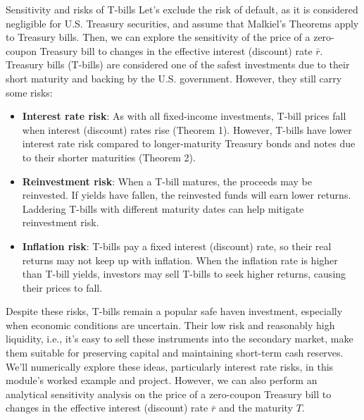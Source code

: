 \documentclass[11pt]{article}
\makeatletter
\theoremstyle{definition}
\renewcommand\subsubsection{\@startsection
	{subsubsection}{2}{0mm}
	{-0.05in}
	{-0.5\baselineskip}
	{\normalfont\normalsize\itshape\bfseries}}
\makeatother
\begin{document}
\subsubsection{Sensitivity and risks of T-bills}
Let's exclude the risk of default, as it is considered negligible for U.S. Treasury securities, and assume that Malkiel's Theorems apply to Treasury bills.
Then, we can explore the sensitivity of the price of a zero-coupon Treasury bill to changes in the effective interest (discount) rate $\bar{r}$.
Treasury bills (T-bills) are considered one of the safest investments due to their short maturity and backing by the U.S. government. 
However, they still carry some risks:
\begin{itemize}[leftmargin=*]
	\item{\textbf{Interest rate risk}: As with all fixed-income investments, T-bill prices fall when interest (discount) rates rise (Theorem 1). 
	However, T-bills have lower interest rate risk compared to longer-maturity Treasury bonds and notes due to their shorter maturities (Theorem 2).}
	\item{\textbf{Reinvestment risk}: When a T-bill matures, the proceeds may be reinvested. If yields have fallen, the reinvested funds will earn lower returns. Laddering T-bills with different maturity dates can help mitigate reinvestment risk.}
	\item{\textbf{Inflation risk}: T-bills pay a fixed interest (discount) rate, so their real returns may not keep up with inflation. When the inflation rate is higher than T-bill yields, investors may sell T-bills to seek higher returns, causing their prices to fall.}
\end{itemize}
Despite these risks, T-bills remain a popular safe haven investment, especially when economic conditions are uncertain. 
Their low risk and reasonably high liquidity, i.e., it's easy to sell these instruments into the secondary market, make them suitable for preserving capital and maintaining short-term cash reserves.
We’ll numerically explore these ideas, particularly interest rate risks, in this module’s worked example and project.
However, we can also perform an analytical sensitivity analysis on the price of a zero-coupon Treasury bill to changes in the effective interest (discount) rate $\bar{r}$ and the maturity $T$.
\end{document}
